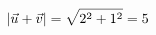 \documentclass[preview]{standalone}
\begin{document}
\begin{align*}
\abs{\vec{u} + \vec{v}} = \sqrt{2^2 + 1^2} =5
\end{align*}
\end{document}

